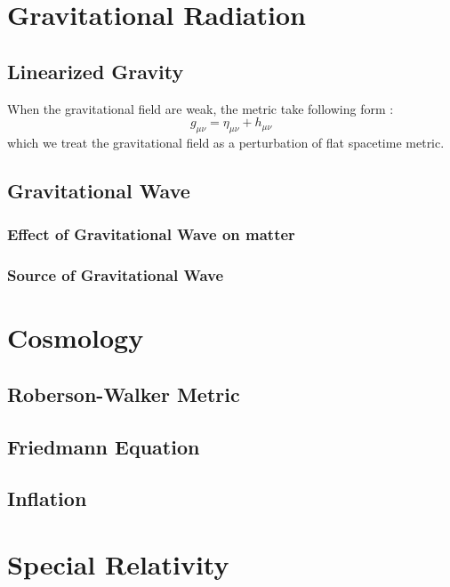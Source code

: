 \documentclass[12pt]{article}
\theoremstyle{mystyle}{\newtheorem{definition}{Definition}[section]}
\theoremstyle{mystyle}{\newtheorem{theorem}[definition]{Theorem}}
\theoremstyle{mystyle}{\newtheorem*{remark}{Remark}}
\theoremstyle{mystyle}{\newtheorem*{example}{Example}}
\theoremstyle{mystyle}{\newtheorem*{examples}{Examples}}
\theoremstyle{cstyle}{\newtheorem*{cthm}{}}
\begin{document}
\section{Gravitational Radiation}
\subsection{Linearized Gravity}
When the gravitational field are weak, the metric take following form :\[g_{\mu\nu} = \eta_{\mu\nu} + h_{\mu\nu} \]
which we treat the gravitational field as a perturbation of flat spacetime metric.
\subsection{Gravitational Wave}
\subsubsection{Effect of Gravitational Wave on matter}
\subsubsection{Source of Gravitational Wave}

\section{Cosmology}
\subsection{Roberson-Walker Metric}
\subsection{Friedmann Equation}
\subsection{Inflation}

\newpage
\appendix



\section{Special Relativity}
\end{document}
